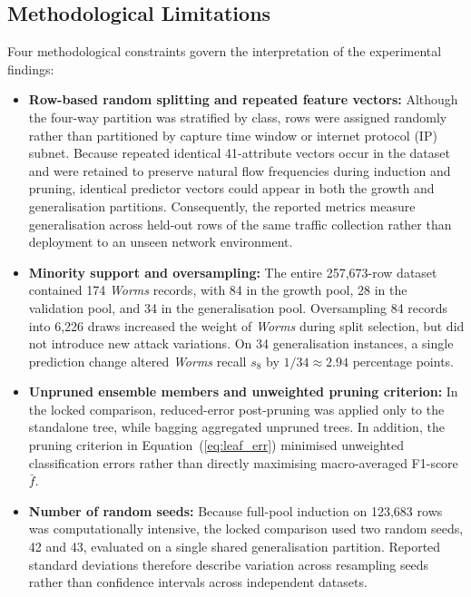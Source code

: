 \subsection{Methodological Limitations}
\label{subsec:res_limits}
Four methodological constraints govern the interpretation of the experimental findings:
\begin{itemize}
    \item \textbf{Row-based random splitting and repeated feature vectors:} Although the four-way partition was stratified by class, rows were assigned randomly rather than partitioned by capture time window or internet protocol (IP) subnet. Because repeated identical 41-attribute vectors occur in the dataset and were retained to preserve natural flow frequencies during induction and pruning, identical predictor vectors could appear in both the growth and generalisation partitions. Consequently, the reported metrics measure generalisation across held-out rows of the same traffic collection rather than deployment to an unseen network environment.
    \item \textbf{Minority support and oversampling:} The entire 257,673-row dataset contained 174 \emph{Worms} records, with 84 in the growth pool, 28 in the validation pool, and 34 in the generalisation pool. Oversampling 84 records into 6,226 draws increased the weight of \emph{Worms} during split selection, but did not introduce new attack variations. On 34 generalisation instances, a single prediction change altered \emph{Worms} recall $s_8$ by $1/34 \approx 2.94$ percentage points.
    \item \textbf{Unpruned ensemble members and unweighted pruning criterion:} In the locked comparison, reduced-error post-pruning was applied only to the standalone tree, while bagging aggregated unpruned trees. In addition, the pruning criterion in Equation~(\ref{eq:leaf_err}) minimised unweighted classification errors rather than directly maximising macro-averaged F1-score $\bar{f}$.
    \item \textbf{Number of random seeds:} Because full-pool induction on 123,683 rows was computationally intensive, the locked comparison used two random seeds, 42 and 43, evaluated on a single shared generalisation partition. Reported standard deviations therefore describe variation across resampling seeds rather than confidence intervals across independent datasets.
\end{itemize}
